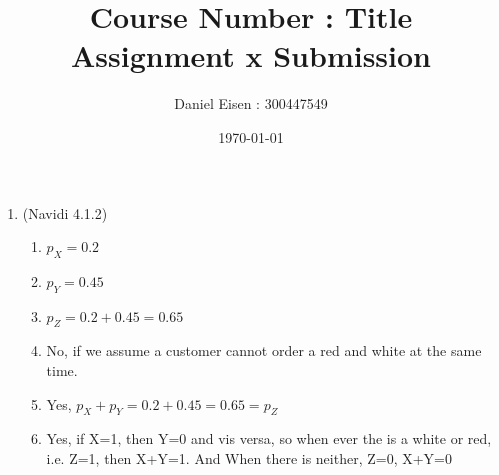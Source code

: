 \documentclass[11pt]{article}
\title{Course Number : Title \\ Assignment x Submission}
\author{Daniel Eisen : 300447549}
\date{\today}
\begin{document}
\begin{preview}
\maketitle
\begin{enumerate}
\section*{Bernoulli Distribution}
\item  (Navidi  4.1.2) %
\begin{enumerate}
        \item $p_X = 0.2$
        \item $p_Y = 0.45$
        \item $p_Z = 0.2+0.45=0.65$
        \item No, if we assume a customer cannot order a red and white at the same time. 
        \item Yes, $p_X+p_Y = 0.2+0.45=0.65=p_Z $
        \item Yes, if X=1, then Y=0 and vis versa, so when ever the is a white or red, i.e. Z=1, then X+Y=1. And When there is neither, Z=0, X+Y=0 
        
\end{enumerate}


\end{enumerate}
\end{preview}
\end{document}
